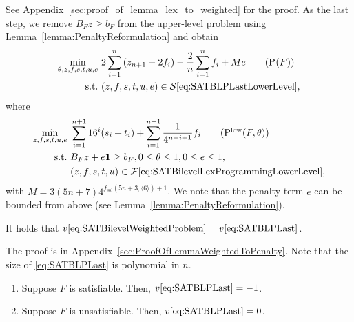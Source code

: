 \documentclass[runningheads,orivec]{llncs}
\newif\ifIPCOFlag
\newcommand{\IPCO}[2]{\ifIPCOFlag#1\else#2\fi}
\newcommand{\MacroColor}[1]{#1}
\newcommand{\Size}[1]{\langle#1\rangle}
\newcommand{\OneVector}{\mathbf{1}}
\newcommand{\NVariables}{\MacroColor{n}}
\newcommand{\OptValFunc}{\MacroColor{v}}
\newcommand{\OptSolSet}{\MacroColor{\mathcal{S}}}
\newcommand{\FeasSolSet}{\MacroColor{\mathcal{F}}}
\newcommand{\SATBooleanFormula}{\MacroColor{F}}
\newcommand{\SolutionSizeEstimate}{\MacroColor{f_{\mathrm{sol}}}}
\newcommand{\ReformZ}{\MacroColor{z}}
\newcommand{\ReformAugFrac}{\MacroColor{f}}
\newcommand{\ReformPen}{\MacroColor{e}}
\newcommand{\LexUVar}{\MacroColor{\theta}}
\newcommand{\LexLVarS}{\MacroColor{s}}
\newcommand{\LexLVarT}{\MacroColor{t}}
\newcommand{\LexLVarU}{\MacroColor{u}}
\newcommand{\LexWeightValue}{\MacroColor{16}}
\newcommand{\EncodingSize}{size}
\begin{document}
See \IPCO{the full version of the paper~\cite{sugishita2025complexitybilevellinearprogramming}}{Appendix~\ref{sec:proof_of_lemma_lex_to_weighted}} for the proof.
As the last step, we remove $B_{\SATBooleanFormula} \ReformZ \ge b_{\SATBooleanFormula}$ from the upper-level problem using Lemma~\ref{lemma:PenaltyReformulation} and obtain
\begin{align}
\min_{\LexUVar, \ReformZ, \ReformAugFrac, \LexLVarS, \LexLVarT, \LexLVarU, \ReformPen} \ & 
2 \sum_{i = 1}^{n} \left(\ReformZ_{\NVariables + 1} - 2 \ReformAugFrac_i \right) - \frac{2}{n} \sum_{i = 1}^n \ReformAugFrac_i + M \ReformPen
\tag{P${}_{\text{}}^{\text{}}(\SATBooleanFormula)$}
\label{eq:SATBLPLast}
\\
\text{s.t.} \
&
(\ReformZ, \ReformAugFrac, \LexLVarS, \LexLVarT, \LexLVarU, \ReformPen) 
\in
\OptSolSet\eqref{eq:SATBLPLastLowerLevel},
\notag 
\end{align}
where
\begin{align}
\min_{\ReformZ, \ReformAugFrac, \LexLVarS, \LexLVarT, \LexLVarU, \ReformPen} \ & 
\sum_{i = 1}^{\NVariables + 1}
\LexWeightValue^i (\LexLVarS_i + \LexLVarT_i)
+ 
\sum_{i = 1}^{\NVariables + 1} \frac{1}{4^{\NVariables - i + 1}} \ReformAugFrac_i
\tag{P${}_{\text{}}^{\text{low}}(\SATBooleanFormula, \LexUVar)$}
\label{eq:SATBLPLastLowerLevel}
\\
\text{s.t.} \
&
B_{\SATBooleanFormula} \ReformZ + \ReformPen \OneVector \ge b_{\SATBooleanFormula},
0 \le \LexUVar \le 1, 
0 \le \ReformPen \le 1,
\notag \\
&
(\ReformZ, \ReformAugFrac, \LexLVarS, \LexLVarT, \LexLVarU)
\in
\FeasSolSet\eqref{eq:SATBilevelLexProgrammingLowerLevel},
\notag 
\end{align}
with $M = 3 (5 \NVariables + 7) 4^{\SolutionSizeEstimate(5 \NVariables + 3, \Size{6}) +1}$.
\phantomsection\label{Rev:WhyECanBeBounded} We note that the penalty term $e$ can be bounded from above (see Lemma~\ref{lemma:PenaltyReformulation}).

\begin{lemma}
\label{lemma:WeightedToPenalty}
It holds that $\OptValFunc\eqref{eq:SATBilevelWeightedProblem} = \OptValFunc\eqref{eq:SATBLPLast}$.
\end{lemma}
The proof is in \IPCO{the full version of the paper~\cite{sugishita2025complexitybilevellinearprogramming}}{Appendix~\ref{sec:ProofOfLemmaWeightedToPenalty}}.
Note that the \EncodingSize{} of \eqref{eq:SATBLPLast} is polynomial in $\NVariables$.
\begin{lemma}
\label{lemma:ValueOfTransformedInstance}
\mbox{}
\begin{enumerate}
\item
Suppose $\SATBooleanFormula$ is satisfiable.
Then, $\OptValFunc\eqref{eq:SATBLPLast} = -1$.
\item
Suppose $\SATBooleanFormula$ is unsatisfiable.
Then, $\OptValFunc\eqref{eq:SATBLPLast} = 0$.
\end{enumerate}
\end{lemma}
\end{document}
